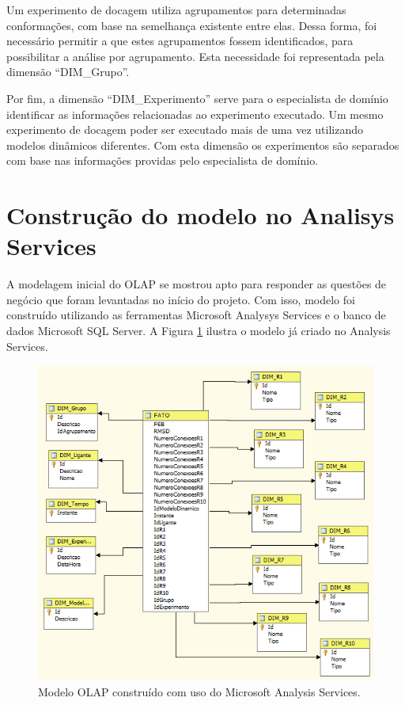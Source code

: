 Um experimento de docagem utiliza agrupamentos para determinadas conformações, com base na semelhança existente entre elas. Dessa forma, foi necessário permitir a que estes agrupamentos fossem identificados, para possibilitar a análise por agrupamento. Esta necessidade foi representada pela dimensão ``DIM\_Grupo''.

Por fim, a dimensão ``DIM\_Experimento'' serve para o especialista de domínio identificar as informações relacionadas ao experimento executado. Um mesmo experimento de docagem poder ser executado mais de uma vez utilizando modelos dinâmicos diferentes. Com esta dimensão os experimentos são separados com base nas informações providas pelo especialista de domínio.


\section{Construção do modelo no Analisys Services}

A modelagem inicial do OLAP se mostrou apto para responder as questões de negócio que foram levantadas no início do projeto. Com isso, modelo foi construído utilizando as ferramentas Microsoft Analysys Services e o banco de dados Microsoft SQL Server. A Figura \ref{fig:ModeloOLAP} ilustra o modelo já criado no Analysis Services.

\begin{figure}[h]
        \center
        \includegraphics[scale=1]{images/ModelagemOLAP.PNG}
        \caption{Modelo OLAP construído com uso do Microsoft Analysis Services.}
        \label{fig:ModeloOLAP}
\end{figure}

